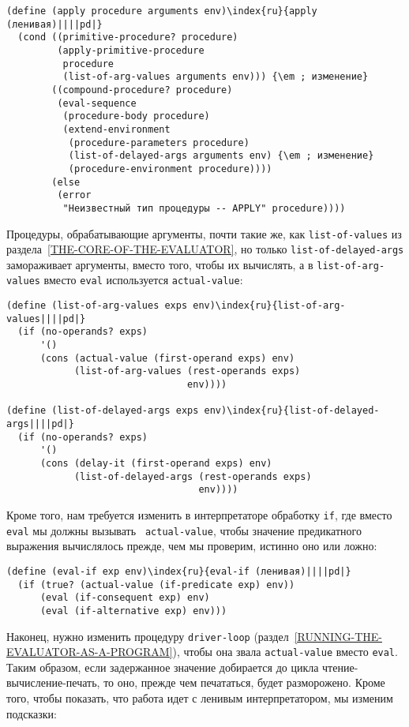 \begin{Verbatim}[fontsize=\small]
(define (apply procedure arguments env)\index{ru}{apply (ленивая)||||pd|}
  (cond ((primitive-procedure? procedure)
         (apply-primitive-procedure
          procedure
          (list-of-arg-values arguments env))) {\em ; изменение}
        ((compound-procedure? procedure)
         (eval-sequence
          (procedure-body procedure)
          (extend-environment
           (procedure-parameters procedure)
           (list-of-delayed-args arguments env) {\em ; изменение}
           (procedure-environment procedure))))
        (else
         (error
          "Неизвестный тип процедуры -- APPLY" procedure))))
\end{Verbatim}
Процедуры, обрабатывающие аргументы, почти такие же, как
{\tt list-of-values} из 
раздела~\ref{THE-CORE-OF-THE-EVALUATOR}, но только
{\tt list-of-delayed-args} замораживает аргументы, вместо того,
чтобы их вычислять, а в {\tt list-of-arg-values} вместо
{\tt eval} используется {\tt actual-value}:
{\sloppy

}
\begin{Verbatim}[fontsize=\small]
(define (list-of-arg-values exps env)\index{ru}{list-of-arg-values||||pd|}
  (if (no-operands? exps)
      '()
      (cons (actual-value (first-operand exps) env)
            (list-of-arg-values (rest-operands exps)
                                env))))

(define (list-of-delayed-args exps env)\index{ru}{list-of-delayed-args||||pd|}
  (if (no-operands? exps)
      '()
      (cons (delay-it (first-operand exps) env)
            (list-of-delayed-args (rest-operands exps)
                                  env))))
\end{Verbatim}

Кроме того, нам требуется изменить в интерпретаторе
обработку {\tt if}, где вместо {\tt eval} мы должны вызывать {\tt
  actual-value}, чтобы значение предикатного выражения вычислялось
прежде, чем мы проверим, истинно оно или ложно: 

\begin{Verbatim}[fontsize=\small]
(define (eval-if exp env)\index{ru}{eval-if (ленивая)||||pd|}
  (if (true? (actual-value (if-predicate exp) env))
      (eval (if-consequent exp) env)
      (eval (if-alternative exp) env)))
\end{Verbatim}

Наконец, нужно изменить процедуру
{\tt driver-loop} 
(раздел~\ref{RUNNING-THE-EVALUATOR-AS-A-PROGRAM}), чтобы она звала
{\tt actual-value} вместо {\tt eval}. Таким образом, если
задержанное значение добирается до цикла чтение-вычисление-печать, то
оно, прежде чем печататься, будет разморожено.  Кроме того, чтобы
показать, что работа идет с ленивым интерпретатором, мы изменим
подсказки:

